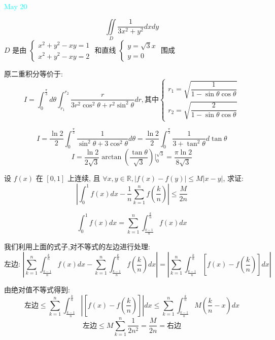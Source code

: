 \textcolor{cyan}{May 20}

\begin{example}[][Exam: 31.3.11]
	$$\iint\limits_{D}\dfrac{1}{3x^2+y^2}dxdy$$
	$D$ 是由 $
	\begin{cases}
		x^2+y^2-xy = 1 \\
		x^2+y^2-xy = 2
	\end{cases}$ 和直线 $\begin{cases}
	  y = \sqrt{3}x \\
	  y = 0
	\end{cases}$ 围成
\end{example}

\begin{solution}
	
	原二重积分等价于: 
	$$I=\int_{0}^{\frac{\pi}{3}}d\theta\int_{r_{1}}^{r_{2}}\dfrac{r}{3r^2\cos ^2\theta+r^2\sin^2\theta}dr,\text{其中}\left\lbrace 
	\begin{array}{l}
		r_{1}=\sqrt{\dfrac{1}{1-\sin \theta\cos\theta}}\\
		r_{2}=\sqrt{\dfrac{2}{1-\sin \theta\cos\theta}}
	\end{array}
	\right. $$
	
	$$I=\frac{\ln 2}{2}\int_{0}^{\frac{\pi}{3}}\dfrac{1}{\sin^2\theta+3\cos^2\theta}d\theta=\frac{\ln 2}{2}\int_{0}^{\frac{\pi}{3}}\dfrac{1}{3+\tan^2\theta}d\tan \theta$$
	$$I=\frac{\ln 2}{2\sqrt{3}}\arctan(\frac{\tan\theta}{\sqrt{3}})|_{0}^{\sqrt{3}}=\frac{\pi \ln 2}{8\sqrt{3}}$$
\end{solution}

\begin{example}[][Exam: 31.3.12]
	设 $f(x)$ 在 $[0,1]$ 上连续, 且 $\forall x,y\in \mathbb{R},|f(x)-f(y)|\leq M|x-y|$, 求证: 
	$$\left| \int_{0}^{1}f(x)dx-\dfrac{1}{n}\sum\limits_{k=1}^{n}f(\dfrac{k}{n})\right|\leq \dfrac{M}{2n}$$
\end{example}

\begin{solution}
	\begin{lemma}[积分和求和]
		
		$$\int_{0}^{1}f(x)dx=\sum\limits_{k=1}^{n}\int_{\frac{k-1}{n}}^{\frac{k}{n}}f(x)dx$$
	\end{lemma}
	我们利用上面的式子,对不等式的左边进行处理: 
	$$\text{左边: }\left| \sum\limits_{k=1}^{n}\int_{\frac{k-1}{n}}^{\frac{k}{n}}f(x)dx-\sum\limits_{k=1}^{n}\int_{\frac{k-1}{n}}^{\frac{k}{n}}f(\frac{k}{n})dx\right|=\left|\sum\limits_{k=1}^{n}\int_{\frac{k-1}{n}}^{\frac{k}{n}}[f(x)-f(\frac{k}{n})]dx\right|$$
	
	由绝对值不等式得到: 
	$$\text{左边}\leq \sum\limits_{k=1}^{n}\int_{\frac{k-1}{n}}^{\frac{k}{n}}\left|  [f(x)-f(\frac{k}{n})]\right|dx\leq  \sum\limits_{k=1}^{n}\int_{\frac{k-1}{n}}^{\frac{k}{n}}M(\frac{k}{n}-x)dx$$
	$$\text{左边}\leq M\sum\limits_{k=1}^{n}\frac{1}{2n^2}=\dfrac{M}{2n}=\text{右边} $$
\end{solution}


